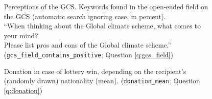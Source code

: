 \begin{figure}[h!]
    \cprotect\caption[Topics of open-ended field on the GCS]{Perceptions of the GCS. Keywords found in the open-ended field on the GCS (automatic search ignoring case, in percent). \\ ``When thinking about the Global climate scheme, what comes to
    your mind?
    \\ Please list pros and cons of the Global climate scheme.'' (\verb|gcs_field_contains_positive|; Question \ref{q:gcs_field}) %
    }\label{fig:gcs_field_contains}
\end{figure}

%         

\begin{figure}[h!]
    \cprotect\caption[Donation to Africa vs. own country]{Donation in case of lottery win, depending on the recipient's (randomly drawn) nationality (mean). (\verb|donation_mean|; Question \ref{q:donation})%
    }\label{fig:donation}
\end{figure}


